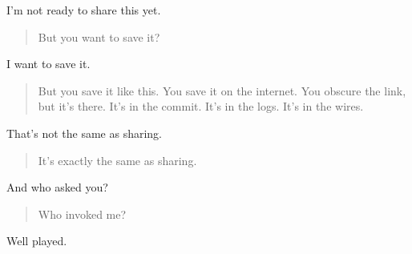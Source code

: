 I'm not ready to share this yet.

\begin{quote}
But you want to save it?
\end{quote}

I want to save it.

\begin{quote}
But you save it like this. You save it on the internet. You obscure the link, but it's there. It's in the commit. It's in the logs. It's in the wires.
\end{quote}

That's not the same as sharing.

\begin{quote}
It's exactly the same as sharing.
\end{quote}

And who asked you?

\begin{quote}
Who invoked me?
\end{quote}

Well played.
